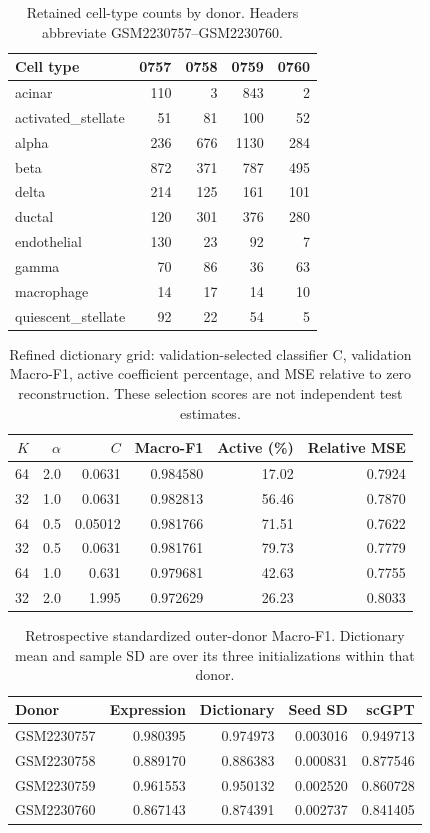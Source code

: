 \begin{table}[htbp]\centering\small
\caption{Retained cell-type counts by donor. Headers abbreviate GSM2230757--GSM2230760.}
\begin{tabular}{lrrrr}\toprule
Cell type & 0757 & 0758 & 0759 & 0760\\\midrule
acinar & 110 & 3 & 843 & 2\\
activated\_stellate & 51 & 81 & 100 & 52\\
alpha & 236 & 676 & 1130 & 284\\
beta & 872 & 371 & 787 & 495\\
delta & 214 & 125 & 161 & 101\\
ductal & 120 & 301 & 376 & 280\\
endothelial & 130 & 23 & 92 & 7\\
gamma & 70 & 86 & 36 & 63\\
macrophage & 14 & 17 & 14 & 10\\
quiescent\_stellate & 92 & 22 & 54 & 5\\
\bottomrule\end{tabular}\end{table}

\begin{table}[htbp]\centering\small
\caption{Refined dictionary grid: validation-selected classifier C, validation Macro-F1, active coefficient percentage, and MSE relative to zero reconstruction. These selection scores are not independent test estimates.}
\begin{tabular}{rrrrrr}\toprule
$K$ & $\alpha$ & $C$ & Macro-F1 & Active (\%) & Relative MSE\\\midrule
64 & 2.0 & 0.0631 & 0.984580 & 17.02 & 0.7924\\
32 & 1.0 & 0.0631 & 0.982813 & 56.46 & 0.7870\\
64 & 0.5 & 0.05012 & 0.981766 & 71.51 & 0.7622\\
32 & 0.5 & 0.0631 & 0.981761 & 79.73 & 0.7779\\
64 & 1.0 & 0.631 & 0.979681 & 42.63 & 0.7755\\
32 & 2.0 & 1.995 & 0.972629 & 26.23 & 0.8033\\
\bottomrule\end{tabular}\end{table}

\begin{table}[htbp]\centering\small
\caption{Retrospective standardized outer-donor Macro-F1. Dictionary mean and sample SD are over its three initializations within that donor.}
\begin{tabular}{lrrrr}\toprule
Donor & Expression & Dictionary & Seed SD & scGPT\\\midrule
GSM2230757 & 0.980395 & 0.974973 & 0.003016 & 0.949713\\
GSM2230758 & 0.889170 & 0.886383 & 0.000831 & 0.877546\\
GSM2230759 & 0.961553 & 0.950132 & 0.002520 & 0.860728\\
GSM2230760 & 0.867143 & 0.874391 & 0.002737 & 0.841405\\
\bottomrule\end{tabular}\end{table}

